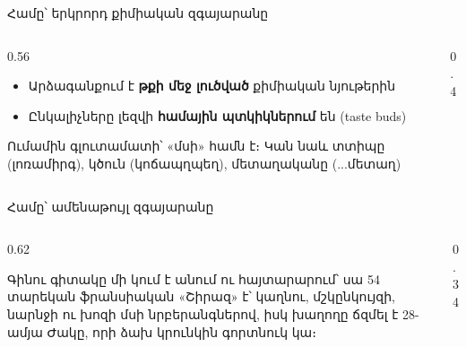 \begin{frame}{Համը՝ երկրորդ քիմիական զգայարանը}
  \begin{columns}[T]
    \begin{column}{0.56\textwidth}
      \begin{itemize}
        \item Արձագանքում է \textbf{թքի մեջ լուծված} քիմիական նյութերին
        \item Ընկալիչները լեզվի \textbf{համային պտկիկներում} են (taste buds)
      \end{itemize}
      \vspace{1mm}
      \par\smallskip
      {\small Ումամին գլուտամատի՝ «մսի» համն է։ Կան նաև տտիպը (լոռամիրգ), կծուն (կոճապղպեղ), մետաղականը (...մետաղ)}
    \end{column}
    \begin{column}{0.4\textwidth}
    \end{column}
  \end{columns}
\end{frame}

\begin{frame}{Համը՝ ամենաթույլ զգայարանը}
  \begin{columns}[c]
    \begin{column}{0.62\textwidth}
      \begin{bookquote}
        Գինու գիտակը մի կում է անում ու հայտարարում՝ սա 54 տարեկան ֆրանսիական «Շիրազ» է՝ կաղնու, մշկընկույզի, նարնջի ու խոզի մսի նրբերանգներով, իսկ խաղողը ճզմել է 28-ամյա Ժակը, որի ձախ կրունկին գորտնուկ կա։
      \end{bookquote}
    \end{column}
    \begin{column}{0.34\textwidth}
      \centering
      \par\medskip
    \end{column}
  \end{columns}
\end{frame}

